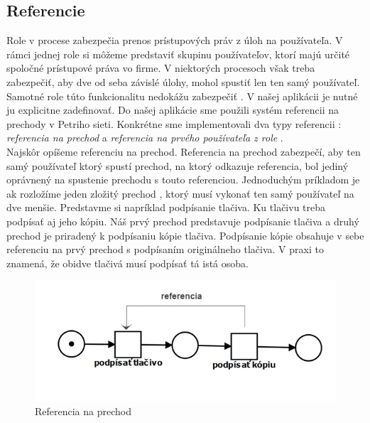 \subsection{Referencie}
Role v procese zabezpečia prenos prístupových práv z úloh na používateľa. V rámci jednej role si môžeme predstaviť skupinu používateľov, ktorí majú určité spoločné prístupové práva vo firme. V niektorých procesoch však treba zabezpečiť, aby dve od seba závislé úlohy, mohol spustiť len ten samý používateľ. Samotné role túto funkcionalitu nedokážu zabezpečiť . V našej aplikácii je nutné ju explicitne zadefinovať. Do našej aplikácie sme použili systém referencii na prechody v Petriho sieti. Konkrétne sme implementovali dva typy referencii : \emph{referencia na prechod} a \emph{referencia na prvého používateľa z role} .\\ 

Najskôr opíšeme referenciu na prechod. Referencia na prechod zabezpečí, aby ten samý používateľ ktorý spustí prechod, na ktorý odkazuje referencia, bol jediný oprávnený na spustenie prechodu s touto referenciou. Jednoduchým príkladom je ak rozložíme jeden zložitý prechod , ktorý musí vykonať ten samý používateľ na dve menšie. Predstavme si napríklad podpísanie tlačiva. Ku tlačivu treba podpísať aj jeho kópiu. Náš prvý prechod predstavuje podpísanie tlačiva a druhý prechod je priradený k podpísaniu kópie tlačiva. Podpísanie kópie obsahuje v sebe referenciu na prvý prechod s podpísaním originálneho tlačiva. V praxi to znamená, že obidve tlačivá musí podpísať tá istá osoba. \\

	\begin{figure}[h]
		\centering
		\includegraphics[width=0.7\linewidth]{images/referencia}
		\caption{Referencia na prechod}
		\label{fig:referencia_na_prechod}
	\end{figure}


